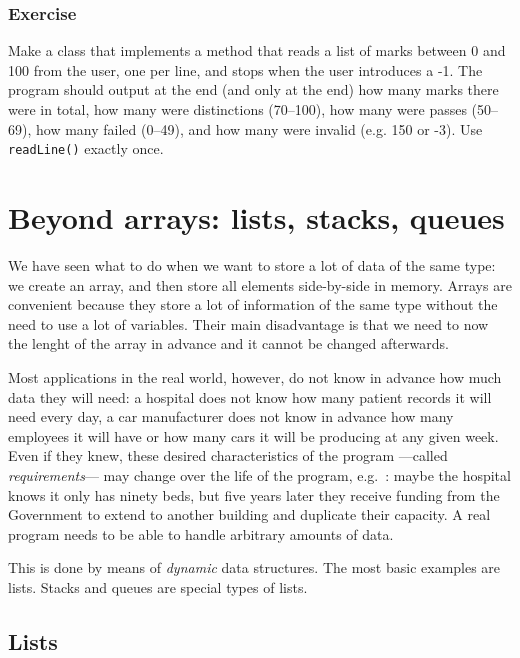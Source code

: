 %
%
%
%
%
%

\subsubsection*{Exercise}

Make a class that implements a method 
that reads a list of marks between 0 and 100 from the
user, one per line, and stops when the user introduces a -1. The
program should output at the end (and only at the end) how many marks
there were in total, how many were distinctions (70--100), how many
were passes (50--69), how many failed (0--49), and how many were
invalid (e.g. 150 or -3). Use \texttt{readLine()} exactly once.

\section{Beyond arrays: lists, stacks, queues}
\label{sec:beyond-arrays:-lists}

We have seen what to do when we want to store a lot of data of the
same type: we create an array, and then store all elements
side-by-side in memory. Arrays are convenient because they store a lot
of information of the same type without 
the need to use a lot of variables. Their main disadvantage is that we
need to now the lenght of the array in advance and it cannot be
changed afterwards. 

Most applications in the real world, however, do not know in advance
how much data they will need: a hospital does not know how many
patient records it will need every day, a car manufacturer does not
know in advance how many employees it will have or how many cars it
will be producing at any given week. Even if they knew, these
desired characteristics of the program ---called
\emph{requirements}--- may change over the life of the program, e.g.~:
maybe the hospital knows it only has ninety beds, but five years later
they receive funding from the Government to extend to another building
and duplicate their capacity. A real program needs to be able to
handle arbitrary amounts of data. 

This is done by means of \emph{dynamic} data structures. The most basic
examples are lists. Stacks and queues are special types of lists. 

\subsection{Lists}
\label{sec:lists}

